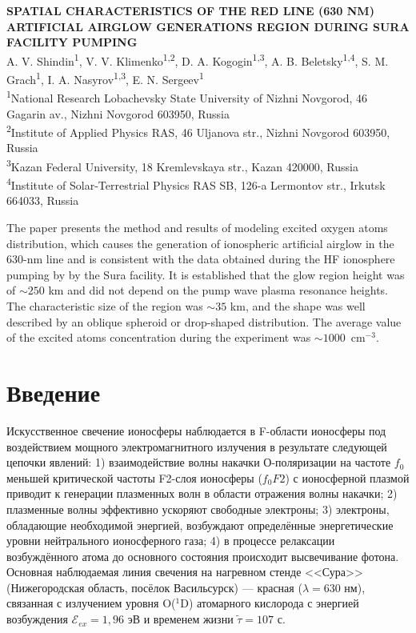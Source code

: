 \documentclass[12pt,a4paper]{article}
\begin{document}
\begin{center}
	{\large\bf
		SPATIAL CHARACTERISTICS OF THE RED LINE (630 NM) ARTIFICIAL AIRGLOW GENERATIONS REGION DURING SURA FACILITY PUMPING}\\
		\vskip 0.5cm
	A. V. Shindin\textsuperscript{1}, V. V. Klimenko\textsuperscript{1,2}, D. A. Kogogin\textsuperscript{1,3}, A. B. Beletsky\textsuperscript{1,4}, S. M. Grach\textsuperscript{1}, I. A. Nasyrov\textsuperscript{1,3}, E. N. Sergeev\textsuperscript{1}\\
		\vskip 0.5cm
	\textsuperscript{1}National Research Lobachevsky State University of Nizhni Novgorod,
	46 Gagarin av., Nizhni Novgorod 603950, Russia\\
	\textsuperscript{2}Institute of Applied Physics RAS,
	46 Uljanova str., Nizhni Novgorod 603950, Russia\\
	\textsuperscript{3}Kazan Federal University,
	18 Kremlevskaya str., Kazan 420000, Russia\\
	\textsuperscript{4}Institute of Solar-Terrestrial Physics RAS SB,
	126-a Lermontov str., Irkutsk 664033, Russia\\
	
\end{center}
The paper presents the method and  results of modeling excited oxygen atoms distribution, which causes the generation of ionospheric artificial airglow in the 630-nm line and is consistent with the data obtained during the HF ionosphere pumping by by the Sura facility. It is established that the glow region height was of $\sim250$ km and did not depend on the pump wave plasma resonance heights. The characteristic size of the region was $\sim35$ km, and the shape was well described by an oblique spheroid or drop-shaped distribution. The average value of the excited atoms concentration during the experiment was $\sim1000 $~cm$^{-3}$.\\

\clearpage

\section{Введение}
\label{sec:intro}

Искусственное свечение ионосферы наблюдается в F-области ионосферы под воздействием мощного электромагнитного излучения в результате следующей цепочки явлений: 1) взаимодействие волны накачки О-поляризации на частоте $f_0$ меньшей критической частоты F2-слоя ионосферы ($f_{0}F2$) с ионосферной плазмой приводит к генерации плазменных волн в области отражения волны накачки; 2) плазменные волны эффективно ускоряют свободные электроны; 3) электроны, обладающие необходимой энергией, возбуждают определённые энергетические уровни нейтрального ионосферного газа; 4) в процессе релаксации возбуждённого атома до основного состояния происходит высвечивание фотона. Основная наблюдаемая линия свечения на нагревном стенде <<Сура>> (Нижегородская область, посёлок Васильсурск) --- красная ($\lambda = 630$ нм), связанная с излучением уровня O($^1$D) атомарного кислорода с энергией возбуждения $\mathcal{E}_{ex} = 1,96$ эВ и временем жизни $\widetilde{\tau} = 107$ с.
\end{document}

